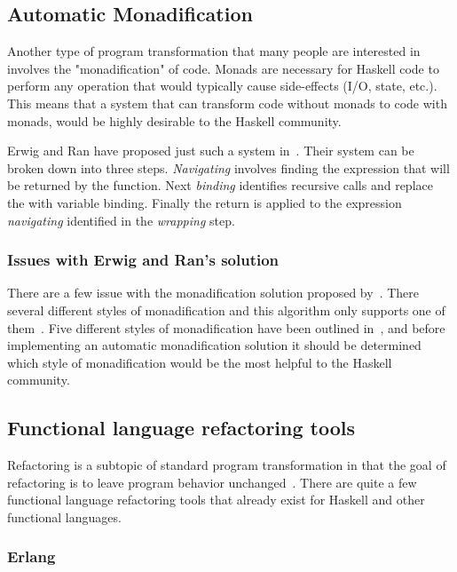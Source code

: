 \subsection{Automatic Monadification}\label{erwigMonad}

Another type of program transformation that many people are interested in involves the "monadification" of code. Monads are necessary for Haskell code to perform any operation that would typically cause side-effects (I/O, state, etc.). This means that a system that can transform code without monads to code with monads, would be highly desirable to the Haskell community.

Erwig and Ran have proposed just such a system in~\citep{monadification}. Their system can be broken down into three steps. \textit{Navigating} involves finding the expression that will be returned by the function. Next \textit{binding} identifies recursive calls and replace the with variable binding. Finally the return is applied to the expression \textit{navigating} identified in the \textit{wrapping} step.

\subsubsection{Issues with Erwig and Ran's solution}

There are a few issue with the monadification solution proposed by~\citep{monadification}. There several different styles of monadification and this algorithm only supports one of them~\citep{clausMonadResponse}. Five different styles of monadification have been outlined in~\citep{monadSurvey}, and before implementing an automatic monadification solution it should be determined which style of monadification would be the most helpful to the Haskell community.

\subsection{Functional language refactoring tools}

Refactoring is a subtopic of standard program transformation in that the goal of refactoring is to leave program behavior unchanged~\citep{fowler}. There are quite a few functional language refactoring tools that already exist for Haskell and other functional languages. 

\subsubsection{Erlang}


